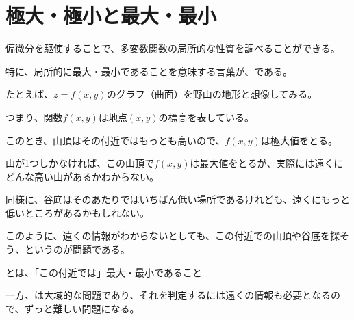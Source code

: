 \documentclass[../../../topic_calculus]{subfiles}
\begin{document}
\sectionline
\section{極大・極小と最大・最小}

偏微分を駆使することで、多変数関数の局所的な性質を調べることができる。

特に、局所的に最大・最小であることを意味する言葉が、である。

\br

たとえば、$z=f(x,y)$のグラフ（曲面）を野山の地形と想像してみる。

つまり、関数$f(x, y)$は地点$(x,y)$の標高を表している。

\br

このとき、山頂はその付近ではもっとも高いので、$f(x, y)$は極大値をとる。

山が1つしかなければ、この山頂で$f(x,y)$は最大値をとるが、実際には遠くにどんな高い山があるかわからない。

同様に、谷底はそのあたりではいちばん低い場所であるけれども、遠くにもっと低いところがあるかもしれない。

\br

このように、遠くの情報がわからないとしても、この付近での山頂や谷底を探そう、というのが問題である。

\begin{emphabox}
  \begin{spacebox}
    \begin{center}
      とは、「この付近では」最大・最小であること
    \end{center}
  \end{spacebox}
\end{emphabox}

\br

一方、は大域的な問題であり、それを判定するには遠くの情報も必要となるので、ずっと難しい問題になる。
\end{document}
